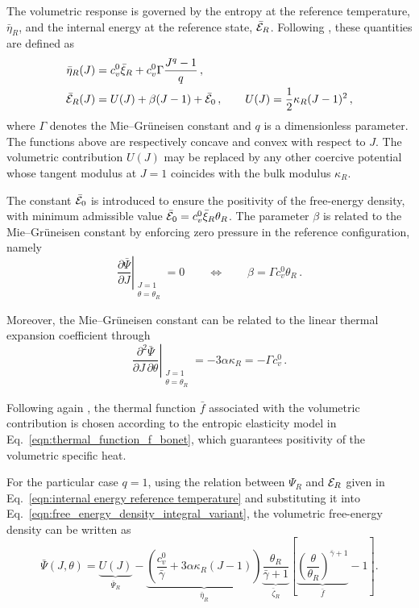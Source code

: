 The volumetric response is governed by the entropy at the reference temperature, $\bar{\eta}_R$, and the internal energy at the reference state, $\bar{\mathcal{E}}_R$. Following \cite{BonetGil2026}, these quantities are defined as
%
\begin{align}
	\label{eqn:volumetric_eta}
	\bar\eta_R(J) &=
	c_v^0 \bar\xi_R
	+ c_v^0 \Gamma \frac{J^q-1}{q} \,,
	\\
	\label{eqn:volumetric_Epsilon}
	\bar{\mathcal{E}}_R(J) &=
	U(J) + \beta (J-1) + \bar{\mathcal{E}}_0 \,,
	\qquad
	U(J)=\frac{1}{2}\kappa_R (J-1)^2 \,,
\end{align}
%
where $\Gamma$ denotes the Mie--Gr\"uneisen constant and $q$ is a dimensionless parameter. The functions above are respectively concave and convex with respect to $J$. The volumetric contribution $U(J)$ may be replaced by any other coercive potential whose tangent modulus at $J=1$ coincides with the bulk modulus $\kappa_R$.

The constant $\bar{\mathcal{E}}_0$ is introduced to ensure the positivity of the free-energy density, with minimum admissible value
$\bar{\mathcal{E}}_0 = c_v^0 \bar\xi_R \theta_R$.
The parameter $\beta$ is related to the Mie--Gr\"uneisen constant by enforcing zero pressure in the reference configuration, namely
%
\begin{equation}
	\left.
	\frac{\partial \bar\Psi}{\partial J}
	\right|_{\substack{J=1\\ \theta=\theta_R}}
	=0
	\qquad \Longleftrightarrow \qquad
	\beta = \Gamma c_v^0 \theta_R \,.
\end{equation}

Moreover, the Mie--Gr\"uneisen constant can be related to the linear thermal expansion coefficient through
%
\begin{equation}
	\left.
	\frac{\partial^2 \bar\Psi}
	{\partial J \, \partial \theta}
	\right|_{\substack{J=1\\ \theta=\theta_R}}
	=
	-3\alpha \kappa_R
	=
	-\Gamma c_v^0 \,.
\end{equation}

Following again \cite{BonetGil2026}, the thermal function $\bar f$ associated with the volumetric contribution is chosen according to the entropic elasticity model in Eq.~\eqref{eqn:thermal_function_f_bonet}, which guarantees positivity of the volumetric specific heat.

For the particular case $q=1$, using the relation between $\Psi_R$ and $\mathcal{E}_R$ given in Eq.~\eqref{eqn:internal energy reference temperature} and substituting it into Eq.~\eqref{eqn:free_energy_density_integral_variant}, the volumetric free-energy density can be written as
%
\begin{equation}
	\label{eqn:volumetric_free_energy}
	\boxed{
		\bar\Psi(J,\theta)
		=
		\underbrace{U(J)}_{\bar\Psi_R}
		-
		\underbrace{
			\left(
			\frac{c_v^0}{\bar\gamma}
			+
			3\alpha \kappa_R (J-1)
			\right)
		}_{\bar\eta_R}
		\underbrace{
			\frac{\theta_R}{\bar\gamma+1}
		}_{\bar\zeta_R}
		\left[
		\underbrace{
			\left(
			\frac{\theta}{\theta_R}
			\right)^{\bar\gamma+1}
		}_{\bar f}
		-1
		\right] .
	}
\end{equation}

